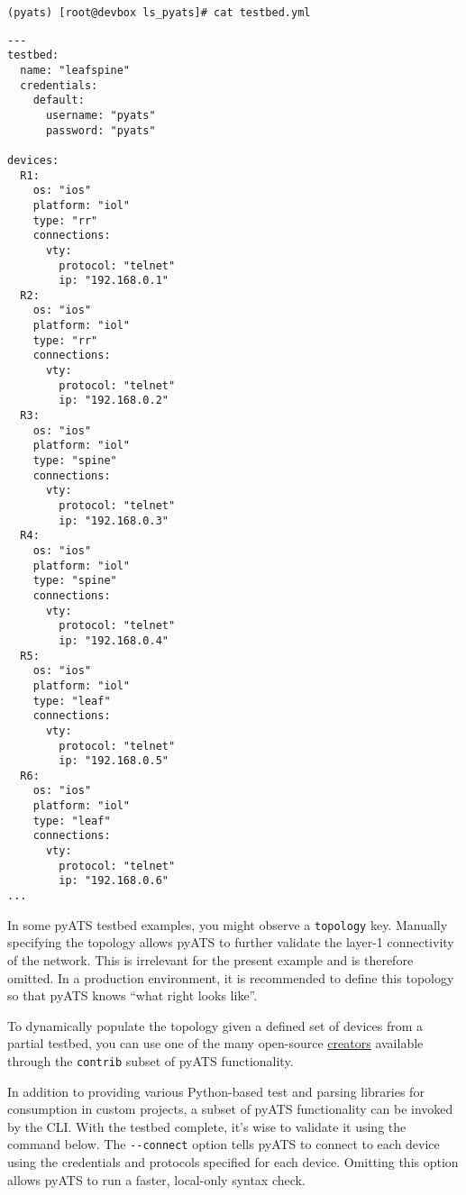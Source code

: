 \begin{verbatim}
(pyats) [root@devbox ls_pyats]# cat testbed.yml
\end{verbatim}

\begin{verbatim}
---
testbed:
  name: "leafspine"
  credentials:
    default:
      username: "pyats"
      password: "pyats"

devices:
  R1:
    os: "ios"
    platform: "iol"
    type: "rr"
    connections:
      vty:
        protocol: "telnet"
        ip: "192.168.0.1"
  R2:
    os: "ios"
    platform: "iol"
    type: "rr"
    connections:
      vty:
        protocol: "telnet"
        ip: "192.168.0.2"
  R3:
    os: "ios"
    platform: "iol"
    type: "spine"
    connections:
      vty:
        protocol: "telnet"
        ip: "192.168.0.3"
  R4:
    os: "ios"
    platform: "iol"
    type: "spine"
    connections:
      vty:
        protocol: "telnet"
        ip: "192.168.0.4"
  R5:
    os: "ios"
    platform: "iol"
    type: "leaf"
    connections:
      vty:
        protocol: "telnet"
        ip: "192.168.0.5"
  R6:
    os: "ios"
    platform: "iol"
    type: "leaf"
    connections:
      vty:
        protocol: "telnet"
        ip: "192.168.0.6"
...
\end{verbatim}

In some pyATS testbed examples, you might observe a \verb|topology| key.
Manually specifying the topology allows pyATS to further validate the layer-1
connectivity of the network. This is irrelevant for the present example
and is therefore omitted. In a production environment, it is recommended to
define this topology so that pyATS knows ``what right looks like''.

To dynamically populate the topology given a defined set of devices from a
partial testbed, you can use one of the many open-source
\href{https://github.com/CiscoTestAutomation/pyats.contrib/tree/master/src/pyats/contrib/creators}{creators}
available through the \verb|contrib| subset of pyATS functionality.

In addition to providing various Python-based test and parsing libraries
for consumption in custom projects, a subset of pyATS functionality can be
invoked by the CLI\@. With the testbed complete, it's wise to validate it
using the command below. The \verb|--connect| option tells pyATS to connect
to each device using the credentials and protocols specified for each device.
Omitting this option allows pyATS to run a faster, local-only syntax check.

